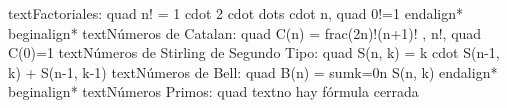 {}\markdownRendererBackslash{}text\markdownRendererLeftBrace{}Factoriales:\markdownRendererRightBrace{} \markdownRendererAmpersand{} \markdownRendererBackslash{}quad n! = 1 \markdownRendererBackslash{}cdot 2 \markdownRendererBackslash{}cdot \markdownRendererBackslash{}dots \markdownRendererBackslash{}cdot n, \markdownRendererBackslash{}quad 0!=1\markdownRendererSoftLineBreak
{}\markdownRendererBackslash{}end\markdownRendererLeftBrace{}align*\markdownRendererRightBrace{}\markdownRendererInterblockSeparator
{}
\markdownRendererSectionEnd \markdownRendererSectionBegin
{}\markdownRendererInterblockSeparator
{}\markdownRendererBackslash{}begin\markdownRendererLeftBrace{}align*\markdownRendererRightBrace{}\markdownRendererSoftLineBreak
{}\markdownRendererBackslash{}text\markdownRendererLeftBrace{}Números de Catalan:\markdownRendererRightBrace{} \markdownRendererAmpersand{} \markdownRendererBackslash{}quad C(n) = \markdownRendererBackslash{}frac\markdownRendererLeftBrace{}(2n)!\markdownRendererRightBrace{}\markdownRendererLeftBrace{}(n+1)! , n!\markdownRendererRightBrace{}, \markdownRendererBackslash{}quad C(0)=1 \markdownRendererBackslash{}\markdownRendererBackslash{}\markdownRendererSoftLineBreak
{}\markdownRendererBackslash{}text\markdownRendererLeftBrace{}Números de Stirling de Segundo Tipo:\markdownRendererRightBrace{} \markdownRendererAmpersand{} \markdownRendererBackslash{}quad S(n, k) = k \markdownRendererBackslash{}cdot S(n-1, k) + S(n-1, k-1) \markdownRendererBackslash{}\markdownRendererBackslash{}\markdownRendererSoftLineBreak
{}\markdownRendererBackslash{}text\markdownRendererLeftBrace{}Números de Bell:\markdownRendererRightBrace{} \markdownRendererAmpersand{} \markdownRendererBackslash{}quad B(n) = \markdownRendererBackslash{}sum\markdownRendererUnderscore{}\markdownRendererLeftBrace{}k=0\markdownRendererRightBrace{}\markdownRendererCircumflex{}\markdownRendererLeftBrace{}n\markdownRendererRightBrace{} S(n, k)\markdownRendererSoftLineBreak
{}\markdownRendererBackslash{}end\markdownRendererLeftBrace{}align*\markdownRendererRightBrace{}\markdownRendererInterblockSeparator
{}
\markdownRendererSectionEnd \markdownRendererSectionBegin
{}\markdownRendererInterblockSeparator
{}\markdownRendererBackslash{}begin\markdownRendererLeftBrace{}align*\markdownRendererRightBrace{}\markdownRendererSoftLineBreak
{}\markdownRendererBackslash{}text\markdownRendererLeftBrace{}Números Primos:\markdownRendererRightBrace{} \markdownRendererAmpersand{} \markdownRendererBackslash{}quad \markdownRendererBackslash{}text\markdownRendererLeftBrace{}no hay fórmula cerrada\markdownRendererRightBrace{} \markdownRendererBackslash{}\markdownRendererBackslash{}\markdownRendererSoftLineBreak
